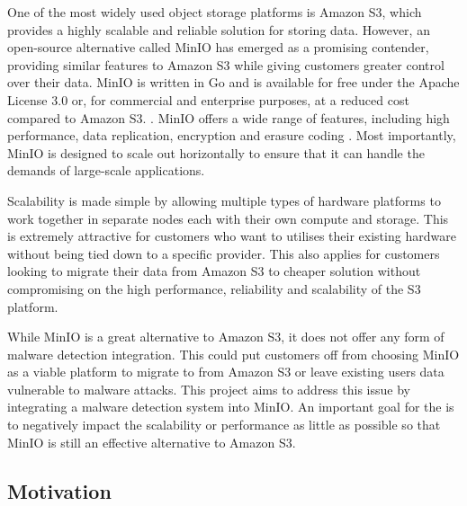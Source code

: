 \documentclass[12pt, conference, final, a4paper, onecolumn, compsoc]{IEEEtran}
\begin{document}

    One of the most widely used object storage platforms is Amazon S3, which
    provides a highly scalable and reliable solution for storing data. However,
    an open-source alternative called MinIO has emerged as a promising
    contender, providing similar features to Amazon S3 while giving customers
    greater control over their data. MinIO is written in Go and is available for
    free under the Apache License 3.0 or, for commercial and enterprise
    purposes, at a reduced cost compared to Amazon S3. \citep{minio-pricing}.
    MinIO offers a wide range of features, including high performance, data
    replication, encryption and erasure coding \citep{minio}. Most importantly,
    MinIO is designed to scale out horizontally to ensure that it can handle the
    demands of large-scale applications.

    Scalability is made simple by allowing multiple types of hardware platforms
    to work together in separate nodes each with their own compute and storage.
    This is extremely attractive for customers who want to utilises their
    existing hardware without being tied down to a specific provider. This also
    applies for customers looking to migrate their data from Amazon S3 to
    cheaper solution without compromising on the high performance, reliability
    and scalability of the S3 platform.

    While MinIO is a great alternative to Amazon S3, it does not offer any form
    of malware detection integration. This could put customers off from choosing
    MinIO as a viable platform to migrate to from Amazon S3 or leave existing
    users data vulnerable to malware attacks. This project aims to address this
    issue by integrating a malware detection system into MinIO. An important
    goal for the is to negatively impact the scalability or performance as
    little as possible so that MinIO is still an effective alternative to Amazon S3.

    \subsection*{Motivation}
\end{document}
